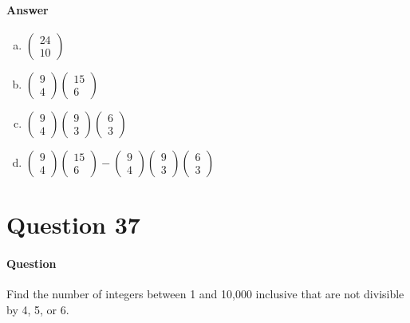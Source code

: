 \documentclass[UTF8]{article}
\begin{document}
\paragraph{Answer}
\begin{enumerate}[(a)]
\item $ \begin{pmatrix} 24 \\ 10 \end{pmatrix} $
\item $ \begin{pmatrix} 9 \\ 4 \end{pmatrix} \begin{pmatrix} 15 \\ 6 \end{pmatrix}$
\item $ \begin{pmatrix} 9 \\ 4 \end{pmatrix} \begin{pmatrix} 9 \\ 3 \end{pmatrix} \begin{pmatrix} 6 \\ 3 \end{pmatrix}$
\item $ \begin{pmatrix} 9 \\ 4 \end{pmatrix} \begin{pmatrix} 15 \\ 6 \end{pmatrix} - \begin{pmatrix} 9 \\ 4 \end{pmatrix} \begin{pmatrix} 9 \\ 3 \end{pmatrix} \begin{pmatrix} 6 \\ 3 \end{pmatrix}$
\end{enumerate}
\section{Question 37}
\paragraph{Question}
Find the number of integers between 1 and 10,000 inclusive that are not divisible by 4, 5, or 6.
\end{document}
